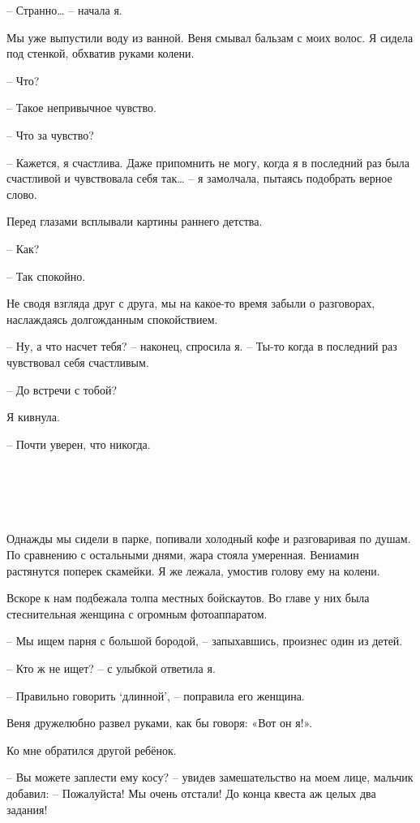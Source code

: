 \documentclass[
]{book}
\begin{document}
-- Странно\ldots{} -- начала я.

Мы уже выпустили воду из ванной. Веня смывал бальзам с моих волос. Я сидела под стенкой, обхватив руками колени.

-- Что?

-- Такое непривычное чувство.

-- Что за чувство?

-- Кажется, я счастлива. Даже припомнить не могу, когда я в последний раз была счастливой и чувствовала себя так\ldots{} -- я замолчала, пытаясь подобрать верное слово.

Перед глазами всплывали картины раннего детства.

-- Как?

-- Так спокойно.

Не сводя взгляда друг с друга, мы на какое-то время забыли о разговорах, наслаждаясь долгожданным спокойствием.

-- Ну, а что насчет тебя? -- наконец, спросила я. -- Ты-то когда в последний раз чувствовал себя счастливым.

-- До встречи с тобой?

Я кивнула.

-- Почти уверен, что никогда.

\hypertarget{chapter-19}{%
\chapter{~}\label{chapter-19}}

Однажды мы сидели в парке, попивали холодный кофе и разговаривая по душам. По сравнению с остальными днями, жара стояла умеренная. Вениамин растянутся поперек скамейки. Я же лежала, умостив голову ему на колени.

Вскоре к нам подбежала толпа местных бойскаутов. Во главе у них была стеснительная женщина с огромным фотоаппаратом.

-- Мы ищем парня с большой бородой, -- запыхавшись, произнес один из детей.

-- Кто ж не ищет? -- с улыбкой ответила я.

-- Правильно говорить `длинной', -- поправила его женщина.

Веня дружелюбно развел руками, как бы говоря: «Вот он я!».

Ко мне обратился другой ребёнок.

-- Вы можете заплести ему косу? -- увидев замешательство на моем лице, мальчик добавил: -- Пожалуйста! Мы очень отстали! До конца квеста аж целых два задания!
\end{document}
